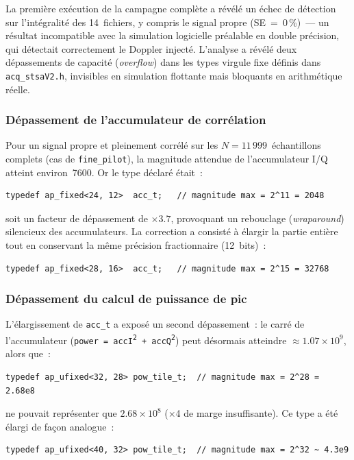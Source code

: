 \documentclass[11pt,a4paper]{article}
\begin{document}
La première exécution de la campagne complète a révélé un échec de détection sur l'intégralité des 14~fichiers, y compris le signal propre (SE~=~0\,\%)~--- un résultat incompatible avec la simulation logicielle préalable en double précision, qui détectait correctement le Doppler injecté. L'analyse a révélé deux dépassements de capacité (\textit{overflow}) dans les types virgule fixe définis dans \texttt{acq\_stsaV2.h}, invisibles en simulation flottante mais bloquants en arithmétique réelle.

\subsubsection{Dépassement de l'accumulateur de corrélation}

Pour un signal propre et pleinement corrélé sur les $N=11\,999$~échantillons complets (cas de \texttt{fine\_pilot}), la magnitude attendue de l'accumulateur I/Q atteint environ~7600. Or le type déclaré était~:
\begin{lstlisting}[numbers=none]
typedef ap_fixed<24, 12>  acc_t;   // magnitude max = 2^11 = 2048
\end{lstlisting}
soit un facteur de dépassement de $\times3.7$, provoquant un rebouclage (\textit{wraparound}) silencieux des accumulateurs. La correction a consisté à élargir la partie entière tout en conservant la même précision fractionnaire (12~bits)~:
\begin{lstlisting}[numbers=none]
typedef ap_fixed<28, 16>  acc_t;   // magnitude max = 2^15 = 32768
\end{lstlisting}

\subsubsection{Dépassement du calcul de puissance de pic}

L'élargissement de \texttt{acc\_t} a exposé un second dépassement~: le carré de l'accumulateur (\texttt{power = accI\textsuperscript{2} + accQ\textsuperscript{2}}) peut désormais atteindre $\approx 1.07\times10^9$, alors que~:
\begin{lstlisting}[numbers=none]
typedef ap_ufixed<32, 28> pow_tile_t;  // magnitude max = 2^28 = 2.68e8
\end{lstlisting}
ne pouvait représenter que $2.68\times10^8$ ($\times$4 de marge insuffisante). Ce type a été élargi de façon analogue~:
\begin{lstlisting}[numbers=none]
typedef ap_ufixed<40, 32> pow_tile_t;  // magnitude max = 2^32 ~ 4.3e9
\end{lstlisting}
\end{document}
